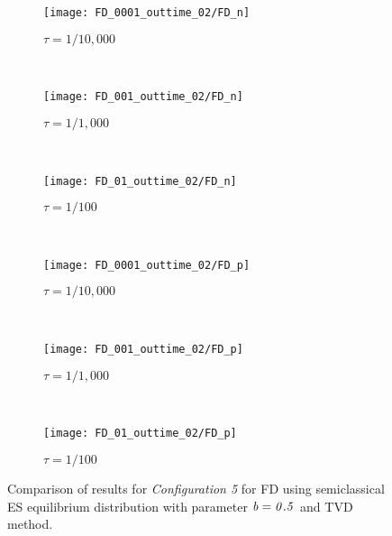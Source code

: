 \documentclass{rsproca}%
\begin{document}
\begin{figure}
        \centering
        \begin{subfigure}[b]{0.32\textwidth}
                \centering
                \texttt{[image: FD\_0001\_outtime\_02/FD\_n]}
                \caption{$\tau = 1/10,000$}
                \label{fig:5ESBGK_FD_n_tau0001}
        \end{subfigure}%
        ~ %
        \begin{subfigure}[b]{0.32\textwidth}
                \centering
                \texttt{[image: FD\_001\_outtime\_02/FD\_n]}
                \caption{$\tau = 1/1,000$}
                \label{fig:5ESBGK_FD_n_tau001}
        \end{subfigure}
        ~ %
        \begin{subfigure}[b]{0.32\textwidth}
                \centering
                \texttt{[image: FD\_01\_outtime\_02/FD\_n]}
                \caption{$\tau = 1/100$}
                \label{fig:5ESBGK_FD_n_tau01}
        \end{subfigure}
				~ %
        \begin{subfigure}[b]{0.32\textwidth}
                \centering
                \texttt{[image: FD\_0001\_outtime\_02/FD\_p]}
                \caption{$\tau = 1/10,000$}
                \label{fig:5ESBGK_FD_p_tau0001}
        \end{subfigure}
        ~ %
        \begin{subfigure}[b]{0.32\textwidth}
                \centering
                \texttt{[image: FD\_001\_outtime\_02/FD\_p]}
                \caption{$\tau = 1/1,000$}
                \label{fig:5ESBGK_FD_p_tau001}
        \end{subfigure}
				~ %
        \begin{subfigure}[b]{0.32\textwidth}
                \centering
                \texttt{[image: FD\_01\_outtime\_02/FD\_p]}
                \caption{$\tau = 1/100$}
                \label{fig:5ESBGK_FD_p_tau01}
        \end{subfigure}
        \caption{Comparison of results for \emph{Configuration 5} for FD using semiclassical ES equilibrium distribution with parameter $\it{b=0.5}$ and TVD method.}
				\label{fig:FD_config5_tau_comparison}
\end{figure}
\end{document}
